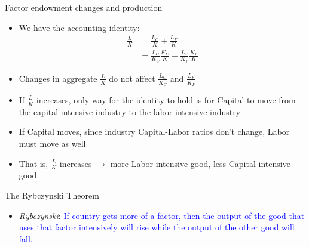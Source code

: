 \documentclass[ignorenonframetext,]{beamer}
\begin{document}
\begin{frame}{Factor endowment changes and production}

    \begin{itemize}
        \item We have the accounting identity:
        \begin{align*}
            \frac{L}{K} &= \frac{L_C}{K} + \frac{L_F}{K} \\
            &= \frac{L_C}{K_C}\frac{K_C}{K} + \frac{L_F}{K_F} \frac{K_F}{K}
        \end{align*}
        \item Changes in aggregate $\frac{L}{K}$ do not affect $\frac{L_C}{K_C}$ and $\frac{L_F}{K_F}$
        \item If $\frac{L}{K}$ increases, only way for the identity to hold is for Capital to move from the capital intensive industry to the labor intensive industry
        \item If Capital moves, since industry Capital-Labor ratios don't change, Labor must move as well
        \item That is, $\frac{L}{K}$ increases $\rightarrow$ more Labor-intensive good, less Capital-intensive good
    \end{itemize}

\end{frame}

\begin{frame}{The Rybczynski Theorem}
    \begin{itemize}
            \item \emph{Rybczynski}: \textcolor{blue}{If country gets more of a factor, then the output of the good that uses that factor intensively will rise while the output of the other good will fall.}
    \end{itemize}
\end{frame}
\end{document}
